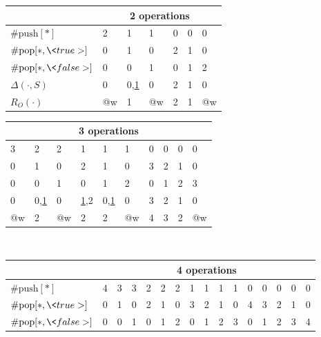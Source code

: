 \begin{figure}[t]
  \centering
  \scriptsize
  \begin{tabular}{|l|p{4mm}p{6mm}p{4mm}p{4mm}p{4mm}p{4mm}|}
    \hline
    & \multicolumn{6}{c|}{2 operations} \\
    \hline
    $\#\mathrm{push}[\ast]$ 
    & 2 & 1 & 1 & 0 & 0 & 0 \\
    $\#\mathrm{pop}[\ast,\<true>]$ 
    & 0 & 1 & 0 & 2 & 1 & 0 \\
    $\#\mathrm{pop}[\ast,\<false>]$
    & 0 & 0 & 1 & 0 & 1 & 2 \\
    \hline
    $\Delta(\cdot,S)$ %
    & 0 & 0,\underline{1} & 0 & 2 & 1 & 0 \\
    $R_O(\cdot)$
    & @w & 1 & @w & 2 & 1 & @w \\
    \hline
  \end{tabular}
  \begin{tabular}{%
    |p{4mm}p{6mm}p{4mm}p{6mm}p{6mm}p{4mm}p{4mm}p{4mm}p{4mm}p{4mm}|}
    \hline
    \multicolumn{10}{|c|}{3 operations} \\
    \hline
    3 & 2 & 2 & 1 & 1 & 1 & 0 & 0 & 0 & 0 \\
    0 & 1 & 0 & 2 & 1 & 0 & 3 & 2 & 1 & 0 \\
    0 & 0 & 1 & 0 & 1 & 2 & 0 & 1 & 2 & 3 \\
    \hline
    0 & 0,\underline{1} & 0 & \underline{1},2 & 0,\underline{1} & 0 & 3 & 2 & 1 & 0 \\
    @w & 2 & @w & 2 & 2 & @w & 4 & 3 & 2 & @w \\
    \hline
  \end{tabular}
  \\[1mm]
  \begin{tabular}{|l|p{4mm}p{6mm}p{4mm}p{8mm}p{6mm}p{4mm}p{6mm}p{6mm}p{6mm}%
    p{4mm}p{4mm}p{4mm}p{4mm}p{4mm}p{4mm}|}
    \hline
    & \multicolumn{15}{c|}{4 operations} \\
    \hline
    $\#\mathrm{push}[\ast]$ 
    & 4 & 3 & 3 & 2 & 2 & 2 & 1 & 1 & 1 & 1 & 0 & 0 & 0 & 0 & 0 \\
    $\#\mathrm{pop}[\ast,\<true>]$ 
    & 0 & 1 & 0 & 2 & 1 & 0 & 3 & 2 & 1 & 0 & 4 & 3 & 2 & 1 & 0 \\
    $\#\mathrm{pop}[\ast,\<false>]$
    & 0 & 0 & 1 & 0 & 1 & 2 & 0 & 1 & 2 & 3 & 0 & 1 & 2 & 3 & 4 \\
    \hline

\end{tabular}
\end{figure}
